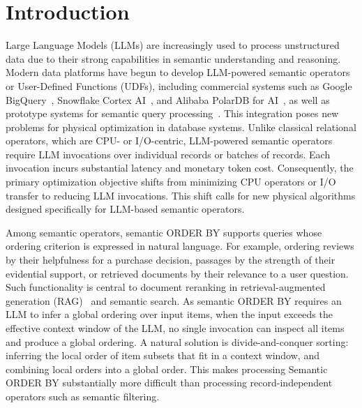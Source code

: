 \section{Introduction}

Large Language Models (LLMs) are increasingly used to process unstructured data due to their strong capabilities in semantic understanding and reasoning.
Modern data platforms have begun to develop LLM-powered semantic operators or User-Defined Functions (UDFs), including commercial systems such as Google BigQuery~\cite{google2026bigqueryai}, Snowflake Cortex AI~\cite{snowflake2026cortexai}, and Alibaba PolarDB for AI~\cite{alibaba2026polardbai}, as well as prototype systems for semantic query processing~\cite{DBLP:journals/pvldb/PatelJPGAGZ25}. This integration poses new problems for physical optimization in database systems. 
Unlike classical relational operators, which are CPU- or I/O-centric, LLM-powered semantic operators require LLM invocations over individual records or batches of records. 
Each invocation incurs substantial latency and monetary token cost. Consequently, the primary optimization objective shifts from minimizing CPU operators or I/O transfer to reducing LLM invocations.  This shift calls for new physical algorithms designed specifically for LLM-based semantic operators.

Among semantic operators, semantic \textsf{ORDER BY} supports queries whose ordering criterion is expressed in natural language.
For example, ordering reviews by their helpfulness for a purchase decision, passages by the strength of their evidential support, or retrieved documents by their relevance to a user question. 
Such functionality is central to document reranking in retrieval-augmented generation (RAG)~\cite{DBLP:conf/nips/YuP0WYZSC24} and semantic search. As semantic \textsf{ORDER BY} requires an LLM to infer a global ordering over input items, when the input exceeds the effective context window of the LLM, no single invocation can inspect all items and produce a global ordering. 
A natural solution is divide-and-conquer sorting: inferring the local order of item subsets that fit in a context window, and combining local orders into a global order. 
This makes processing Semantic \textsf{ORDER BY} substantially more difficult than processing record-independent operators such as semantic filtering. 


